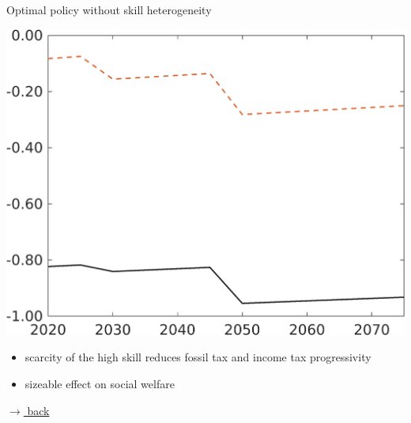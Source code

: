 \documentclass[11pt,aspectratio=169]{beamer}
\begin{document}
\begin{frame}{Optimal policy without skill heterogeneity}
\begin{minipage}[]{0.3\textwidth}
	\end{minipage}
	\begin{minipage}[]{0.3\textwidth}
		\includegraphics[width=1\textwidth]{../codding_model/own_basedOnFried/optimalPol_elastS_DisuSci/figures/all_1705/Single_OPT_T_NoTaus_SWF_spillover0_skillComp_sep1_BN0_ineq0_red0_etaa0.79_lgd0.png}
	\end{minipage}
	
	\vspace{4mm}
	\begin{itemize}
		\item scarcity of the high skill reduces fossil tax and income tax progressivity
		\item sizeable effect on social welfare
	\end{itemize}
	\vspace{0mm}
	\hfill
	\hyperlink{effalloback}{\tiny{$\rightarrow$ back}}
\end{frame}
\end{document}
